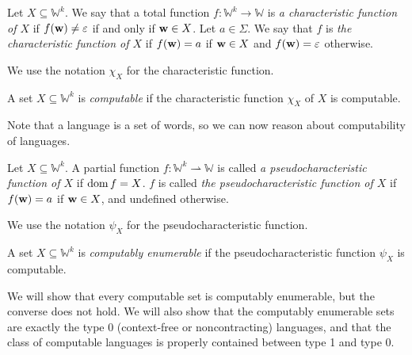 \begin{definition}
	Let \( X \subseteq \mathbb W^k \).
	We say that a total function \( f \colon \mathbb W^k \to \mathbb W \) is \emph{a characteristic function of \( X \)} if \( f(\vb w) \neq \varepsilon \) if and only if \( \vb w \in X \).
	Let \( a \in \Sigma \).
	We say that \( f \) is \emph{the characteristic function of \( X \)} if \( f(\vb w) = a \) if \( \vb w \in X \) and \( f(\vb w) = \varepsilon \) otherwise.
\end{definition}
We use the notation \( \chi_X \) for the characteristic function.
\begin{definition}
	A set \( X \subseteq \mathbb W^k \) is \emph{computable} if the characteristic function \( \chi_X \) of \( X \) is computable.
\end{definition}
Note that a language is a set of words, so we can now reason about computability of languages.
\begin{definition}
	Let \( X \subseteq \mathbb W^k \).
	A partial function \( f \colon \mathbb W^k \rightharpoonup \mathbb W \) is called \emph{a pseudocharacteristic function of \( X \)} if \( \operatorname{dom} f = X \).
	\( f \) is called \emph{the pseudocharacteristic function of \( X \)} if \( f(\vb w) = a \) if \( \vb w \in X \), and undefined otherwise.
\end{definition}
We use the notation \( \psi_X \) for the pseudocharacteristic function.
\begin{definition}
	A set \( X \subseteq \mathbb W^k \) is \emph{computably enumerable} if the pseudocharacteristic function \( \psi_X \) is computable.
\end{definition}
\begin{remark}
	We will show that every computable set is computably enumerable, but the converse does not hold.
	We will also show that the computably enumerable sets are exactly the type 0 (context-free or noncontracting) languages, and that the class of computable languages is properly contained between type 1 and type 0.
\end{remark}


